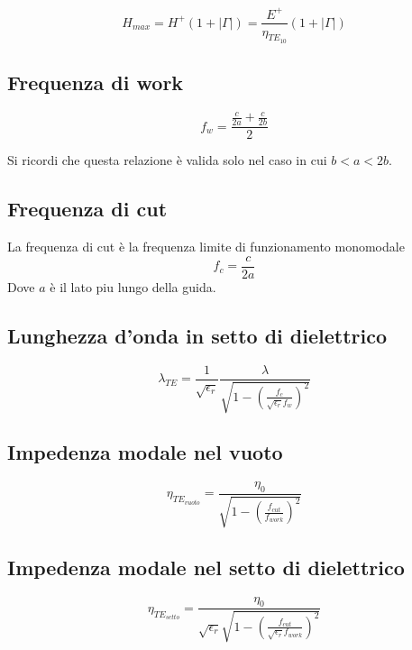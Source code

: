 \documentclass[10pt,a4paper]{report}
\begin{document}
				\begin{equation}
				H_{max}=H^+(1+|\Gamma|)=\frac{E^+}{\eta_{TE_{10}}}{(1+|\Gamma|)}
				\end{equation}

		\subsection{Frequenza di work}

				\begin{equation}
				f_w=\frac{\frac{c}{2a}+\frac{c}{2b}}{2}
				\end{equation}

				Si ricordi che questa relazione è valida solo nel caso in cui $b<a<2b$.

		\subsection{Frequenza di cut}
	
				La frequenza di cut è la frequenza limite di funzionamento monomodale
				\begin{equation}
				f_c=\frac{c}{2a}
				\end{equation}
				Dove $a$ è il lato piu lungo della guida.

		\subsection{Lunghezza d'onda in setto di dielettrico}

			\begin{equation}
			\lambda_{TE}=\frac{1}{\sqrt{\epsilon_r}}\frac{\lambda}{\sqrt{1- (\frac{f_c}{\sqrt{\epsilon_r}f_w})^2}}
			\end{equation}

		\subsection{Impedenza modale nel vuoto}

				\begin{equation}
				\eta_{TE_{vuoto}}=\frac{\eta_0}{ \sqrt{ 1- ( \frac {f_{cut}} {f_{work}} )^2 } }
				\end{equation}
		\subsection{Impedenza modale nel setto di dielettrico}

				\begin{equation}
				\eta_{TE_{setto}}=\frac{\eta_0}{\sqrt{\epsilon_r} \sqrt{ 1- ( \frac {f_{cut}} {\sqrt{\epsilon_r} f_{work}} )^2 } }
				\end{equation}
\end{document}
